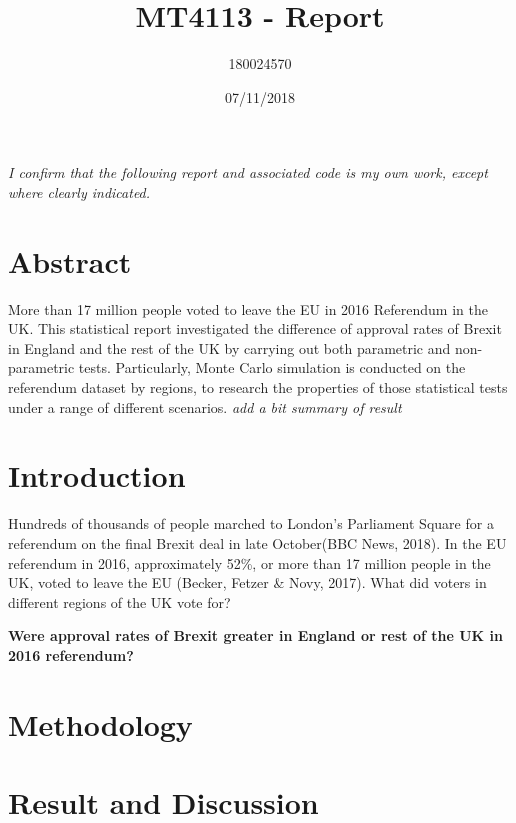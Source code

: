 \documentclass[]{article}
\title{MT4113 - Report}
\author{180024570}
\date{07/11/2018}
\begin{document}
\maketitle

\emph{I conﬁrm that the following report and associated code is my own
work, except where clearly indicated.}

\newpage

\hypertarget{abstract}{%
\section{Abstract}\label{abstract}}

More than 17 million people voted to leave the EU in 2016 Referendum in
the UK. This statistical report investigated the difference of approval
rates of Brexit in England and the rest of the UK by carrying out both
parametric and non-parametric tests. Particularly, Monte Carlo
simulation is conducted on the referendum dataset by regions, to
research the properties of those statistical tests under a range of
different scenarios. \emph{add a bit summary of result}

\hypertarget{introduction}{%
\section{Introduction}\label{introduction}}

Hundreds of thousands of people marched to London's Parliament Square
for a referendum on the final Brexit deal in late October(BBC News,
2018). In the EU referendum in 2016, approximately 52\%, or more than 17
million people in the UK, voted to leave the EU (Becker, Fetzer \& Novy,
2017). What did voters in different regions of the UK vote for?

\textbf{Were approval rates of Brexit greater in England or rest of the
UK in 2016 referendum?}

\hypertarget{methodology}{%
\section{Methodology}\label{methodology}}

\hypertarget{result-and-discussion}{%
\section{Result and Discussion}\label{result-and-discussion}}
\end{document}
